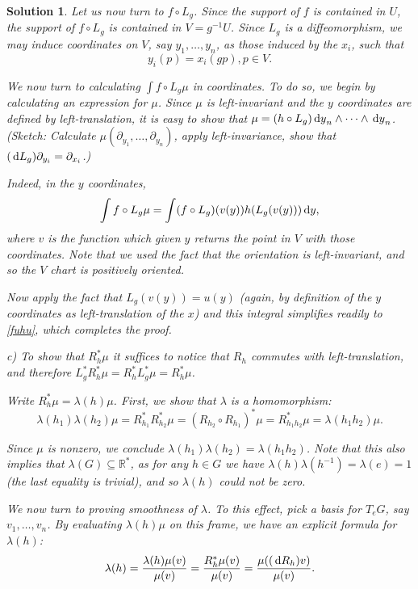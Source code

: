 \documentclass{article}
\theoremstyle{nonumberplain}
\newtheorem{sol}{Solution}
\newcommand{\R}{\mathbb{R}}
\begin{document}
\begin{sol}
Let us now turn to $f \circ L_g$. Since the support of $f$ is contained in $U$, the support of $f \circ L_g$ is contained in $V = g^{-1} U$. Since $L_g$ is a diffeomorphism, we may induce coordinates on $V$, say $y_1, \dots, y_n$, as those induced by the $x_i$, such that
\[ y_i(p) = x_i(gp), p \in V.\]

We now turn to calculating $\int f \circ L_g \mu$ in coordinates. To do so, we begin by calculating an expression for $\mu$. Since $\mu$ is left-invariant and the $y$ coordinates are defined by left-translation, it is easy to show that $\mu = (h \circ L_g) \dl y_n \wedge \dots \wedge \dl y_n$. (Sketch: Calculate $\mu(\partial_{y_1}, \dots, \partial_{y_n})$, apply left-invariance, show that $(\dl L_g) \partial_{y_i} = \partial_{x_i}$.)

Indeed, in the $y$ coordinates,
\[\int f \circ L_g \mu = \int (f \circ L_g)(v(y)) h(L_g(v(y))) \dl y,\]
where $v$ is the function which given $y$ returns the point in $V$ with those coordinates. Note that we used the fact that the orientation is left-invariant, and so the $V$ chart is positively oriented.

Now apply the fact that $L_g(v(y)) = u(y)$ (again, by definition of the $y$ coordinates as left-translation of the $x$) and this integral simplifies readily to \eqref{fuhu}, which completes the proof.

\medskip

c) To show that $R^*_h \mu$ it suffices to notice that $R_h$ commutes with left-translation, and therefore $L^*_g R^*_h \mu = R^*_h L^*_g \mu = R^*_h \mu$.

Write $R^*_h \mu = \lambda(h) \mu$. First, we show that $\lambda$ is a homomorphism:
\[\lambda(h_1) \lambda(h_2) \mu = R^*_{h_1} R^*_{h_2} \mu = (R_{h_2} \circ R_{h_1})^* \mu = R^*_{h_1 h_2} \mu = \lambda(h_1 h_2) \mu.\]

Since $\mu$ is nonzero, we conclude $\lambda(h_1) \lambda(h_2) = \lambda(h_1 h_2)$. Note that this also implies that $\lambda(G) \subseteq \R^*$, as for any $h \in G$ we have $\lambda(h) \lambda(h^{-1}) = \lambda(e) = 1$ (the last equality is trivial), and so $\lambda(h)$ could not be zero.

We now turn to proving smoothness of $\lambda$. To this effect, pick a basis for $T_e G$, say $v_1, \dots, v_n$. By evaluating $\lambda(h) \mu$ on this frame, we have an explicit formula for $\lambda(h)$:
\[\lambda(h) = \frac{\lambda(h) \mu(v)}{\mu(v)} = \frac{R^*_h \mu(v)}{\mu(v)} = \frac{\mu( (\dl R_h) v)}{\mu(v)}.\]


\end{sol}
\end{document}
